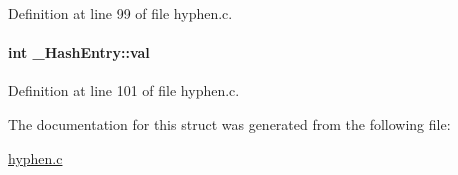 \-Definition at line 99 of file hyphen.\-c.

\hypertarget{struct___hash_entry_a1acd8c25274e1385e1d0624f398e2a06}{
\paragraph[{val}]{\setlength{\rightskip}{0pt plus 5cm}int {\bf \-\_\-\-Hash\-Entry\-::val}}}\label{struct___hash_entry_a1acd8c25274e1385e1d0624f398e2a06}


\-Definition at line 101 of file hyphen.\-c.



\-The documentation for this struct was generated from the following file\-:\begin{DoxyCompactItemize}
\item 
\hyperlink{hyphen_8c}{hyphen.\-c}\end{DoxyCompactItemize}
